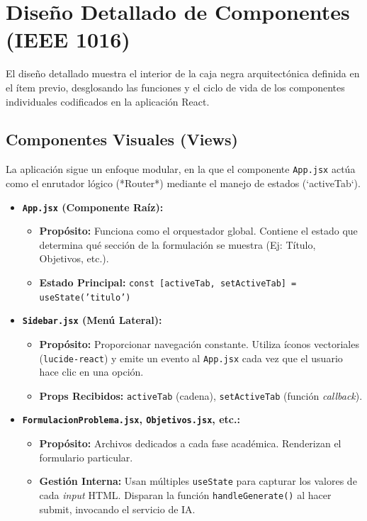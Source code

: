 \section{Diseño Detallado de Componentes (IEEE 1016)}

El diseño detallado muestra el interior de la caja negra arquitectónica definida en el ítem previo, desglosando las funciones y el ciclo de vida de los componentes individuales codificados en la aplicación React. 

\subsection{Componentes Visuales (Views)}
La aplicación sigue un enfoque modular, en la que el componente \texttt{App.jsx} actúa como el enrutador lógico (*Router*) mediante el manejo de estados (`activeTab`).

\begin{itemize}
    \item \textbf{\texttt{App.jsx} (Componente Raíz):}
    \begin{itemize}
        \item \textbf{Propósito:} Funciona como el orquestador global. Contiene el estado que determina qué sección de la formulación se muestra (Ej: Título, Objetivos, etc.).
        \item \textbf{Estado Principal:} \texttt{const [activeTab, setActiveTab] = useState('titulo')}
    \end{itemize}
    
    \item \textbf{\texttt{Sidebar.jsx} (Menú Lateral):}
    \begin{itemize}
        \item \textbf{Propósito:} Proporcionar navegación constante. Utiliza íconos vectoriales (\texttt{lucide-react}) y emite un evento al \texttt{App.jsx} cada vez que el usuario hace clic en una opción.
        \item \textbf{Props Recibidos:} \texttt{activeTab} (cadena), \texttt{setActiveTab} (función \textit{callback}).
    \end{itemize}

    \item \textbf{\texttt{FormulacionProblema.jsx}, \texttt{Objetivos.jsx}, etc.:}
    \begin{itemize}
        \item \textbf{Propósito:} Archivos dedicados a cada fase académica. Renderizan el formulario particular.
        \item \textbf{Gestión Interna:} Usan múltiples \texttt{useState} para capturar los valores de cada \textit{input} HTML. Disparan la función \texttt{handleGenerate()} al hacer submit, invocando el servicio de IA.
    \end{itemize}
\end{itemize}


